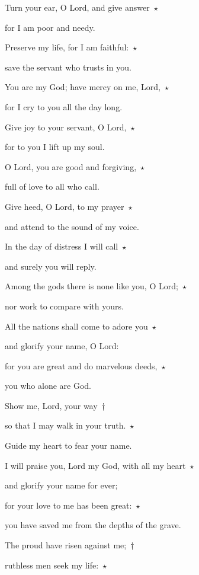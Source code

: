 \noindent Turn your ear, O Lord, and give answer~$\star$~\nopagebreak

for I am poor and needy.

\noindent Preserve my life, for I am faithful:~$\star$~\nopagebreak

save the servant who trusts in you.

\noindent You are my God; have mercy on me, Lord,~$\star$~\nopagebreak

for I cry to you all the day long.

\noindent Give joy to your servant, O Lord,~$\star$~\nopagebreak

for to you I lift up my soul.

\noindent O Lord, you are good and forgiving,~$\star$~\nopagebreak

full of love to all who call.

\noindent Give heed, O Lord, to my prayer~$\star$~\nopagebreak

and attend to the sound of my voice.

\noindent In the day of distress I will call~$\star$~\nopagebreak

and surely you will reply.

\noindent Among the gods there is none like you, O Lord;~$\star$~\nopagebreak

nor work to compare with yours.

\noindent All the nations shall come to adore you~$\star$~\nopagebreak

and glorify your name, O Lord:

\noindent for you are great and do marvelous deeds,~$\star$~\nopagebreak

you who alone are God.

\noindent Show me, Lord, your way~†~\nopagebreak

so that I may walk in your truth.~$\star$~\nopagebreak

Guide my heart to fear your name.

\noindent I will praise you, Lord my God, with all my heart~$\star$~\nopagebreak

and glorify your name for ever;

\noindent for your love to me has been great:~$\star$~\nopagebreak

you have saved me from the depths of the grave.

\noindent The proud have risen against me;~†~\nopagebreak

ruthless men seek my life:~$\star$~\nopagebreak

